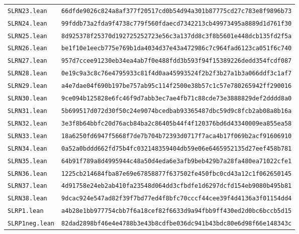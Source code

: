 \begin{center}
\begin{tabular}{ll}
\texttt{SLRN23.lean} & \texttt{66dfde9026c824a8af377f20517cd0b54d94a301b87775cd27c783e8f9896b73}\\
\texttt{SLRN24.lean} & \texttt{99fddb73a2fda9f4738c779f560fdaecd7342213cb49973495a8889d1d761f30}\\
\texttt{SLRN25.lean} & \texttt{8d925378f25370d192725252723e56c3a137dd8c3f8b5601e448dcb135fd2f5a}\\
\texttt{SLRN26.lean} & \texttt{be1f10e1eecb775e769b1da4034d37e43a472986c7c964fad6123ca051f6c740}\\
\texttt{SLRN27.lean} & \texttt{957d7ccee91230eb34ea4ab7f0e488fdd3b593f94f15389226dedd354fcdf087}\\
\texttt{SLRN28.lean} & \texttt{0e19c9a3c8c76e4795933c81f4d0aa45993524f2b2f3b27a1b3a066ddf3c1af7}\\
\texttt{SLRN29.lean} & \texttt{a4e7dae04f690b197be757ab95c114f2500e38b57c1c57e780265942ff290016}\\
\texttt{SLRN30.lean} & \texttt{9ce094b125828e6fc46f9d7abb3ec7ae4fb71c88cde73e3888829def2dddd8a0}\\
\texttt{SLRN31.lean} & \texttt{5b699517d072d30f50c24e9074bcedbab93365487dbc59d9c8fcb2ab08a8b16a}\\
\texttt{SLRN32.lean} & \texttt{3e3f8b64bbfc20d76acb84ba2c86405b44f4f120376bd6d43340009ea855ea58}\\
\texttt{SLRN33.lean} & \texttt{18a6250fd6947f5668f7de7b704b72393d0717f7aca4b17f069b2acf91606910}\\
\texttt{SLRN34.lean} & \texttt{0a52a0bddd662fd75b4fc032148359404db59e06e6465952135d27eef458b781}\\
\texttt{SLRN35.lean} & \texttt{64b91f789a8d4995944c48a50d4eda6e3afb9beb429b7a28fa480ea71022cfe1}\\
\texttt{SLRN36.lean} & \texttt{1225cb214684fba87e69e67858877f637502fe450fbc0cd43a12c1f062650145}\\
\texttt{SLRN37.lean} & \texttt{4d91758e24eb2ab410fa23548d064dd3cfbdfe1d6297dcfd154eb9080b495b81}\\
\texttt{SLRN38.lean} & \texttt{9dcac924e547ad82f39f7bd77ed4f8bfc70cccf44cee39f4d4136a3f01154dd4}\\
\texttt{SLRP1.lean} & \texttt{a4b28e1bb977754cbb7f6a18cef82f6633d9a94fbb9ff430ed2d0bc6bccb5d15}\\
\texttt{SLRP1neg.lean} & \texttt{82dad2898bf46e4e4788b3e43b8cdfbe036dc941b43bdc80e6d98f66e148343c}\\
\bottomrule\end{tabular}\end{center}
